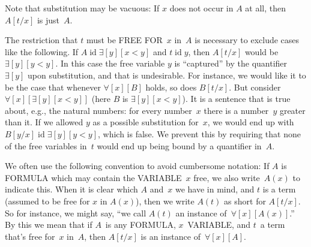\documentclass[10pt,a4paper]{article}
\newcommand*{\olup}[1]{\MakeUppercase{#1}}
\theoremstyle{plain}
\theoremstyle{definition}
\theoremstyle{remark}
\newenvironment{explain}{}{}
\newcommand*{\olchapter}[3]{}
\newcommand*{\olimport}[1]{}
\providecommand{\lforall}{\mathord{\forall}}
\providecommand{\lexists}{\mathord{\exists}}
\providecommand{\Subst}[3]{#1[#2/#3]}
\providecommand{\ident}{\operatorname{id}}
\begin{document}
\begin{explain}
Note that substitution may be vacuous: If $x$ does not occur in $A$
at all, then $\Subst{A}{t}{x}$ is just~$A$.

The restriction that $t$ must be \olup{free for}~$x$ in~$A$ is necessary to
exclude cases like the following. If $A \ident \lexists[y][x < y]$
and $t \ident y$, then $\Subst{A}{t}{x}$ would be $\lexists[y][y <
  y]$. In this case the free variable $y$ is ``captured'' by the
quantifier $\lexists[y]$ upon substitution, and that is undesirable.
For instance, we would like it to be the case that whenever
$\lforall[x][B]$ holds, so does $\Subst{B}{t}{x}$. But consider
$\lforall[x][\lexists[y][x < y]]$ (here $B$ is $\lexists[y][x <
  y]$). It is a sentence that is true about, e.g., the natural numbers:
for every number~$x$ there is a number~$y$ greater than it. If we
allowed $y$ as a possible substitution for~$x$, we would end up with
$\Subst{B}{y}{x} \ident \lexists[y][y < y]$, which is false. We
prevent this by requiring that none of the free variables in~$t$ would
end up being bound by a quantifier in~$A$.
\end{explain}

We often use the following convention to avoid cumbersome notation: If
$A$ is \olup{formula} which may contain the \olup{variable}~$x$ free, we
also write~$A(x)$ to indicate this. When it is clear which $A$
and~$x$ we have in mind, and $t$ is a term (assumed to be free for $x$
in $A(x)$), then we write $A(t)$ as short for $\Subst{A}{t}{x}$. So
for instance, we might say, ``we call $A(t)$ an instance
of~$\lforall[x][A(x)]$.'' By this we mean that if $A$~is any
\olup{formula}, $x$~\olup{variable}, and $t$~a term that's free for~$x$
in~$A$, then $\Subst{A}{t}{x}$ is an instance of~$\lforall[x][A]$.





\olchapter{fol}{syn}{Syntax and Semantics}

\olimport{introduction}

\olimport{first-order-languages}

\olimport{terms-formulas}

\olimport{unique-readability}

\olimport{main-operator}

\olimport{subformulas}

\olimport{formation-sequences}
\end{document}

